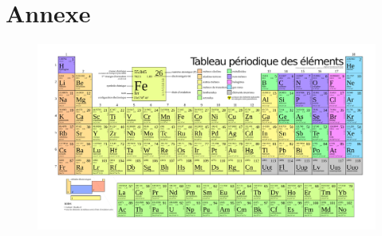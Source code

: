 \documentclass[11pt,a4paper,fleqn,pdftex]{report}
\begin{document}
\chapter{Annexe} %
\label{cha:annexe_chimie}
\ifoptionfinal{\begin{landscape}}{}
\begin{figure}
\centering
\includegraphics[keepaspectratio,width=\linewidth]{svg/tableau-periodique.pdf}

\end{figure}
\end{document}
